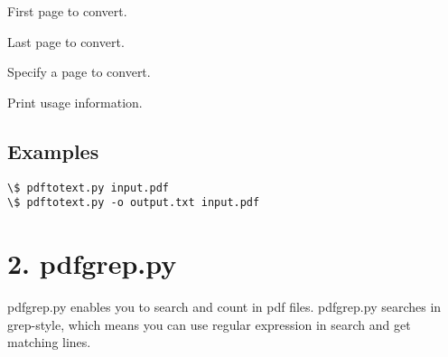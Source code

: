 \documentclass[letterpaper,10pt,oneside]{sphinxmanual}
\begin{document}

\begin{fulllineitems}
\label{utility:cmdoption-pdftotext.py-f}
First page to convert.

\end{fulllineitems}


\begin{fulllineitems}
\label{utility:cmdoption-pdftotext.py-l}
Last page to convert.

\end{fulllineitems}


\begin{fulllineitems}
\label{utility:cmdoption-pdftotext.py-p}
Specify a page to convert.

\end{fulllineitems}


\begin{fulllineitems}
\label{utility:cmdoption-pdftotext.py-h}
Print usage information.

\end{fulllineitems}



\subsection{Examples}
\label{utility:examples}
\begin{Verbatim}[commandchars=\\\{\}]
\$ pdftotext.py input.pdf
\$ pdftotext.py -o output.txt input.pdf
\end{Verbatim}


\section{2. pdfgrep.py}
\label{utility:pdfgrep-py}
pdfgrep.py enables you to search and count in pdf files. pdfgrep.py searches in grep-style, which means you can use regular expression in search and get matching lines.
\end{document}
